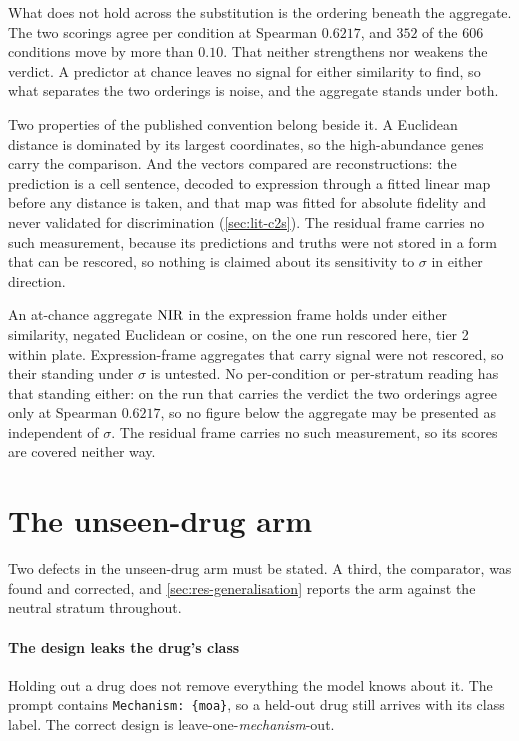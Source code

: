 What does not hold across the substitution is the ordering beneath the
aggregate. The two scorings agree per condition at Spearman $0.6217$, and $352$
of the $606$ conditions move by more than $0.10$. That neither strengthens nor
weakens the verdict. A predictor at chance leaves no signal for either
similarity to find, so what separates the two orderings is noise, and the
aggregate stands under both.

Two properties of the published convention belong beside it. A Euclidean
distance is dominated by its largest coordinates, so the high-abundance genes
carry the comparison. And the vectors compared are reconstructions: the
prediction is a cell sentence, decoded to expression through a fitted linear map
before any distance is taken, and that map was fitted for absolute fidelity and
never validated for discrimination (\cref{sec:lit-c2s}). The residual frame
carries no such measurement, because its predictions and truths were not stored
in a form that can be rescored, so nothing is claimed about its sensitivity to
$\sigma$ in either direction.

\begin{scopelimit}
An at-chance aggregate $\textrm{NIR}$ in the expression frame holds under either
similarity, negated Euclidean or cosine, on the one run rescored here, tier 2
within plate. Expression-frame aggregates that carry signal were not rescored,
so their standing under $\sigma$ is untested. No per-condition or per-stratum
reading has that standing either: on the run that carries the verdict the two
orderings agree only at Spearman $0.6217$, so no figure below the aggregate may
be presented as independent of $\sigma$. The residual frame carries no such
measurement, so its scores are covered neither way.
\end{scopelimit}

\section{The unseen-drug arm}
\label{sec:lim-unseen}

Two defects in the unseen-drug arm must be stated. A third, the comparator, was
found and corrected, and \cref{sec:res-generalisation} reports the arm against
the neutral stratum throughout.

\paragraph{The design leaks the drug's class} Holding out a drug does not
remove everything the model knows about it. The prompt contains
\texttt{Mechanism: \{moa\}}, so a held-out drug still arrives with its class
label. The correct design is leave-one-\emph{mechanism}-out.

